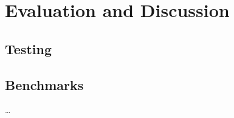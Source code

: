 \chapter{Evaluation and Discussion}
\label{chap:eval}
\section{Testing}

\section{Benchmarks}


\ldots

